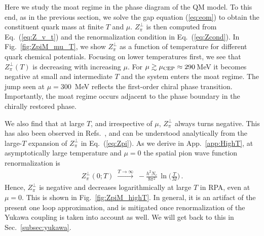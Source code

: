 \documentclass[reprint,english,superscriptaddress,preprintnumbers,amsmath,amssymb,aps,prd]{revtex4-2}
\def\eq#1{(\ref{#1})}
\def\Eq#1{Eq.~(\ref{#1})}
\def\Fig#1{Fig.~\ref{#1}}
\def\Sec#1{Sec.~\ref{#1}}
\def\App#1{App.~\ref{#1}}
\begin{document}
Here we study the moat regime in the phase diagram of the QM model. To this end, as in the previous section, we solve the gap equation \eq{eq:eom} to obtain the constituent quark mass at finite $T$ and $\mu$. $Z^\perp_\pi$ is then computed from \Eq{eq:Z_v_t} and the renormalization condition in \Eq{eq:Zcond}. 
In \Fig{fig:ZpiM_mu_T}, we show $Z^\perp_\pi$ as a function of temperature for different quark chemical potentials. Focusing on lower temperatures first, we see that $Z^\perp_\pi(T)$ is decreasing with increasing $\mu$. For $\mu \gtrsim \mu_{\rm CEP} \approx 290$\,MeV it becomes negative at small and intermediate $T$ and the system enters the moat regime. The jump seen at $\mu = 300$\, MeV reflects the first-order chiral phase transition. Importantly, the moat regime occurs adjacent to the phase boundary in the chirally restored phase.

We also find that at large $T$, and irrespective of $\mu$, $Z^\perp_\pi$ always turns negative. This has also been observed in Refs.\ \cite{Topfel:2024iop,Cao:2025zvh}, and can be understood analytically from the large-$T$ expansion of $Z^\perp_\pi$ in \Eq{eq:Zpi}. As we derive in \App{app:HighT}, at asymptotically large temperature and $\mu= 0$ the spatial pion wave function renormalization is
\begin{align}\label{eq:ZpilargeT}
    Z^\perp_\pi(0;T) \;\xrightarrow{T\rightarrow \infty}\; - \frac{h^2 N_c}{8\pi^2}\, \ln\bigg(\frac{T}{M}\bigg)\,.
\end{align}
Hence, $Z^\perp_\pi$ is negative and decreases logarithmically at large $T$ in RPA, even at $\mu=0$. This is shown in \Fig{fig:ZpiM_highT}. In general, it is an artifact of the present one loop approximation, and is mitigated once renormalization of the Yukawa coupling is taken into account as well. We will get back to this in \Sec{subsec:yukawa}.
\end{document}
